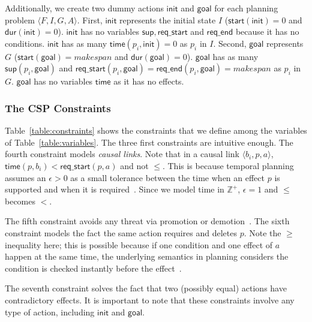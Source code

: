 \documentclass{ecai}
\newcommand{\tup}[1]{{\langle #1 \rangle}}
\newcommand{\dur}{\mathsf{dur}}    %
\newcommand{\start}{\mathsf{start}}%
\newcommand{\supp}{\mathsf{sup}}   %
\newcommand{\tim}{\mathsf{time}}   %
\newcommand{\reqs}{\mathsf{req\_{start}}} %
\newcommand{\reqe}{\mathsf{req\_{end}}}   %
\newcommand{\ini}{\mathsf{init}}   %
\newcommand{\goal}{\mathsf{goal}}  %
\begin{document}
Additionally, we create two dummy actions $\ini$ and $\goal$ for each planning problem $\tup{F,I,G,A}$. First, $\ini$ represents the initial state $I$ ($\start(\ini)=0$ and $\dur(\ini)=0$). $\ini$ has no variables $\supp, \reqs$ and $\reqe$ because it has no conditions. $\ini$ has as many $\tim(p_i,\ini)=0$ as $p_i$ in $I$. Second, $\goal$ represents $G$ ($\start(\goal)=makespan$ and $\dur(\goal)=0$). $\goal$ has as many $\supp(p_i,\goal)$ and $\reqs(p_i,\goal)=\reqe(p_i,\goal)=makespan$ as $p_i$ in $G$. $\goal$ has no variables $\tim$ as it has no effects.


\subsubsection{The CSP Constraints}

Table~\ref{table:constraints} shows the constraints that we define among the variables of Table~\ref{table:variables}. The three first constraints are intuitive enough. The fourth constraint models {\em causal links}. Note that in a causal link $\tup{b_i,p,a}$, $\tim(p,b_i) < \reqs(p,a)$ and not $\leq$. This is because temporal planning assumes an $\epsilon > 0$ as a small tolerance between the time when an effect $p$ is supported and when it is required~\cite{fox2003pddl2}. Since we model time in $\mathbb{Z}^+$, $\epsilon=1$ and $\leq$ becomes $<$.

The fifth constraint avoids any threat via promotion or demotion~\cite{ghallab2004automated}. The sixth constraint models the fact the same action requires and deletes $p$. Note the $\geq$ inequality here; this is possible because if one condition and one effect of $a$ happen at the same time, the underlying semantics in planning considers the condition is checked instantly before the effect~\cite{fox2003pddl2}.

The seventh constraint solves the fact that two (possibly equal) actions have contradictory effects. It is important to note that these constraints involve any type of action, including $\ini$ and $\goal$.
\end{document}
